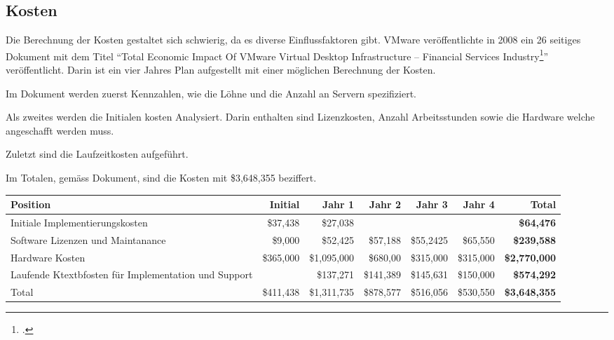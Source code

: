 \subsection{Kosten}
\label{fig:vmwareCosts}
Die Berechnung der Kosten gestaltet sich schwierig, da es diverse Einflussfaktoren gibt.
VMware veröffentlichte in 2008 ein 26 seitiges Dokument mit dem Titel "`Total Economic Impact Of VMware Virtual Desktop Infrastructure – Financial Services Industry\footcite{Forrester_Report}"' veröffentlicht. Darin ist ein vier Jahres Plan aufgestellt mit einer möglichen Berechnung der Kosten.

Im Dokument werden zuerst Kennzahlen, wie die Löhne und die Anzahl an Servern spezifiziert.

Als zweites werden die Initialen kosten Analysiert. Darin enthalten sind Lizenzkosten, Anzahl Arbeitsstunden sowie die Hardware welche angeschafft werden muss.

Zuletzt sind die Laufzeitkosten aufgeführt.

Im Totalen, gemäss Dokument, sind die Kosten mit \$3,648,355 beziffert. 

\begin{table}[H]
	\centering
	\small\renewcommand{\arraystretch}{1.4}  
	\begin{tabularx}{\textwidth}{X | r | r | r | r | r | r}
		\hline
		\rowcolor{tableheadcolor}
		\textbf{Position} & \textbf{Initial} & \textbf{Jahr 1} & \textbf{Jahr 2} & \textbf{Jahr 3} & \textbf{Jahr 4} & \textbf{Total} \\
		\hline
		Initiale Implementierungskosten & \$37,438 & \$27,038 &  &  &  & \textbf{\$64,476} \\
		Software Lizenzen und \linebreak
		Maintanance & \$9,000 & \$52,425 & \$57,188 & \$55,2425 & \$65,550 & \textbf{\$239,588} \\
		Hardware Kosten & \$365,000 & \$1,095,000 & \$680,00 & \$315,000 & \$315,000 & \textbf{\$2,770,000} \\
		Laufende Ktextbfosten für \linebreak
		Implementation und Support &  & \$137,271 & \$141,389 & \$145,631 & \$150,000 & \textbf{\$574,292} \\
		\hline
		\rowcolor{tableheadcolor}
		Total & \$411,438 & \$1,311,735 & \$878,577 & \$516,056 & \$530,550 & \textbf{\$3,648,355} \\
	\end{tabularx}
\end{table}

